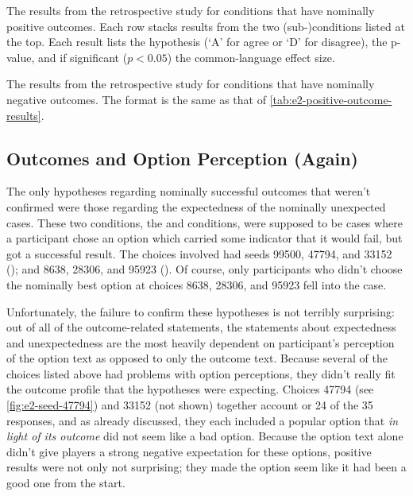 \begin{table}[!p]
\centering
\bgroup
\def\arraystretch{1.2}
\setlength{\tabcolsep}{0.4em}

\egroup
\caption[Retrospective positive outcome results]{The results from the retrospective study for conditions that have nominally positive outcomes. Each row stacks results from the two (sub-)conditions listed at the top. Each result lists the hypothesis (`A' for agree or `D' for disagree), the p-value, and if significant ($p < 0.05$) the common-language effect size.}
  \label{tab:e2-positive-outcome-results}
\end{table}

\begin{table}[!p]
\centering
\bgroup
\def\arraystretch{1.2}
\setlength{\tabcolsep}{0.4em}

\egroup
\caption[Retrospective negative outcome results]{The results from the retrospective study for conditions that have nominally negative outcomes. The format is the same as that of \cref{tab:e2-positive-outcome-results}.}
\label{tab:e2-negative-outcome-results}
\end{table}


\subsection{Outcomes and Option Perception (Again)}

The only hypotheses regarding nominally successful outcomes that weren't confirmed were those regarding the expectedness of the nominally unexpected cases.
%
These two conditions, the \unxs{} and \obvfa{} conditions, were supposed to be cases where a participant chose an option which carried some indicator that it would fail, but got a successful result.
%
The choices involved had seeds 99500, 47794, and 33152 (\unxs{}); and 8638, 28306, and 95923 (\obvf{}).
%
Of course, only participants who didn't choose the nominally best option at choices 8638, 28306, and 95923 fell into the \obvfa{} case.


Unfortunately, the failure to confirm these hypotheses is not terribly surprising: out of all of the outcome-related statements, the statements about expectedness and unexpectedness are the most heavily dependent on participant's perception of the option text as opposed to only the outcome text.
%
Because several of the choices listed above had problems with option perceptions, they didn't really fit the outcome profile that the hypotheses were expecting.
%
Choices 47794 (see \cref{fig:e2-seed-47794}) and 33152 (not shown) together account or 24 of the 35 \unxs{} responses, and as already discussed, they each included a popular option that \emph{in light of its outcome} did not seem like a bad option.
%
Because the option text alone didn't give players a strong negative expectation for these options, positive results were not only not surprising; they made the option seem like it had been a good one from the start.


